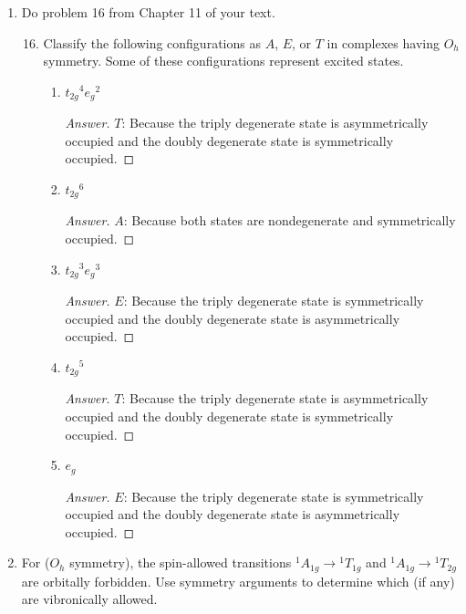\documentclass[../psets.tex]{subfiles}
\begin{document}
\begin{enumerate}[label={\Roman*)}]
    \item Do problem 16 from Chapter 11 of your text.
    \begin{enumerate}[label={\textbf{11.\arabic*}}]
        \setcounter{enumii}{15}
        \item Classify the following configurations as $A$, $E$, or $T$ in complexes having $O_h$ symmetry. Some of these configurations represent excited states.
        \begin{enumerate}[label={\textbf{\alph*.}}]
            \item ${t_{2g}}^4{e_g}^2$
            \begin{proof}[Answer]
                $T$: Because the triply degenerate state is asymmetrically occupied and the doubly degenerate state is symmetrically occupied.
            \end{proof}
            \item ${t_{2g}}^6$
            \begin{proof}[Answer]
                $A$: Because both states are nondegenerate and symmetrically occupied.
            \end{proof}
            \item ${t_{2g}}^3{e_g}^3$
            \begin{proof}[Answer]
                $E$: Because the triply degenerate state is symmetrically occupied and the doubly degenerate state is asymmetrically occupied.
            \end{proof}
            \item ${t_{2g}}^5$
            \begin{proof}[Answer]
                $T$: Because the triply degenerate state is asymmetrically occupied and the doubly degenerate state is symmetrically occupied.
            \end{proof}
            \item $e_g$
            \begin{proof}[Answer]
                $E$: Because the triply degenerate state is symmetrically occupied and the doubly degenerate state is asymmetrically occupied.
            \end{proof}
        \end{enumerate}
    \end{enumerate}
    \newpage
    \item For  ($O_h$ symmetry), the spin-allowed transitions ${}^1A_{1g}\to{}^1T_{1g}$ and ${}^1A_{1g}\to{}^1T_{2g}$ are orbitally forbidden. Use symmetry arguments to determine which (if any) are vibronically allowed.

\end{enumerate}
\end{document}
